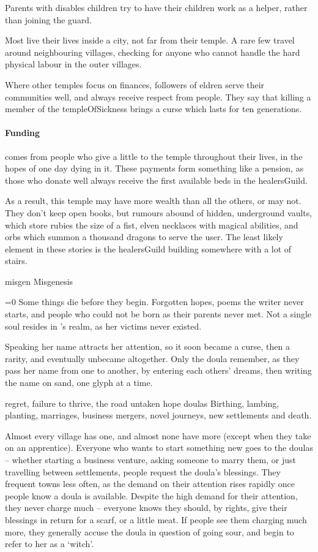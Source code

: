 \begin{multicols}{2}
Parents with disables children try to have their children work as a helper, rather than joining the \gls{guard}.

Most live their lives inside a city, not far from their temple.
A rare few travel around neighbouring \glspl{village}, checking for anyone who cannot handle the hard physical labour in the outer \glspl{village}.

Where other temples focus on finances, followers of \gls{eldren} serve their communities well, and always receive respect from people.
They say that killing a member of the \gls{templeOfSickness} brings a curse which lasts for ten generations.

\paragraph{Funding}
comes from people who give a little to the temple throughout their lives, in the hopes of one day dying in it.
These payments form something like a pension, as those who donate well always receive the first available beds in the \gls{healersGuild}.

As a result, this temple may have more wealth than all the others, or may not.
They don't keep open books, but rumours abound of hidden, underground vaults, which store rubies the size of a fist, elven necklaces with magical abilities, and orbs which summon a thousand dragons to serve the user.
The least likely element in these stories is the \gls{healersGuild} building somewhere with a lot of stairs.

\guild{\hphantom{Nulla}}%
  {\gls{misgen}}%
  {Misgenesis}%
  {
  \ifnum\value{temperature}=0\fi
  Some things die before they begin.
  Forgotten hopes, poems the writer never starts, and people who could not be born as their parents never met.
  Not a single soul resides in \hphantom{Nulla}'s realm, as her victims never existed.

  Speaking her name attracts her attention, so it soon became a curse, then a rarity, and eventually unbecame altogether.
  Only the doula remember, as they pass her name from one to another, by entering each others' dreams, then writing the name on sand, one glyph at a time.
  }%
  {regret, failure to thrive, the road untaken}%
  {hope}%
  {\Glspl{doula}}%
  {
    Birthing, lambing, planting, marriages, business mergers, novel journeys, new settlements and death.
  }%

Almost every \gls{village} has one, and almost none have more (except when they take on an apprentice).
Everyone who wants to start something new goes to the \glspl{doula} -- whether starting a business venture, asking someone to marry them, or just travelling between settlements, people request the doula's blessings.
They frequent towns less often, as the demand on their attention rises rapidly once people know a doula is available.
Despite the high demand for their attention, they never charge much -- everyone knows they should, by rights, give their blessings in return for a scarf, or a little meat.
If people see them charging much more, they generally accuse the doula in question of going sour, and begin to refer to her as a `witch'.


\end{multicols}
